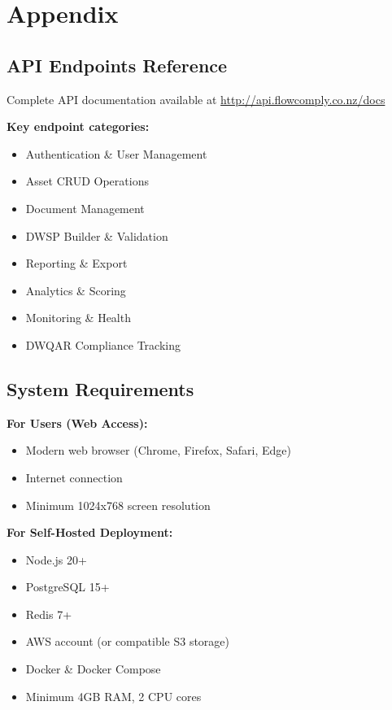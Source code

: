 \documentclass[11pt,a4paper]{article}
\begin{document}
\newpage

\section{Appendix}

\subsection{API Endpoints Reference}

Complete API documentation available at \url{http://api.flowcomply.co.nz/docs}

\textbf{Key endpoint categories:}
\begin{itemize}[itemsep=0.2em]
    \item Authentication \& User Management
    \item Asset CRUD Operations
    \item Document Management
    \item DWSP Builder \& Validation
    \item Reporting \& Export
    \item Analytics \& Scoring
    \item Monitoring \& Health
    \item DWQAR Compliance Tracking
\end{itemize}

\subsection{System Requirements}

\textbf{For Users (Web Access):}
\begin{itemize}[itemsep=0.2em]
    \item Modern web browser (Chrome, Firefox, Safari, Edge)
    \item Internet connection
    \item Minimum 1024x768 screen resolution
\end{itemize}

\textbf{For Self-Hosted Deployment:}
\begin{itemize}[itemsep=0.2em]
    \item Node.js 20+
    \item PostgreSQL 15+
    \item Redis 7+
    \item AWS account (or compatible S3 storage)
    \item Docker \& Docker Compose
    \item Minimum 4GB RAM, 2 CPU cores
\end{itemize}
\end{document}

